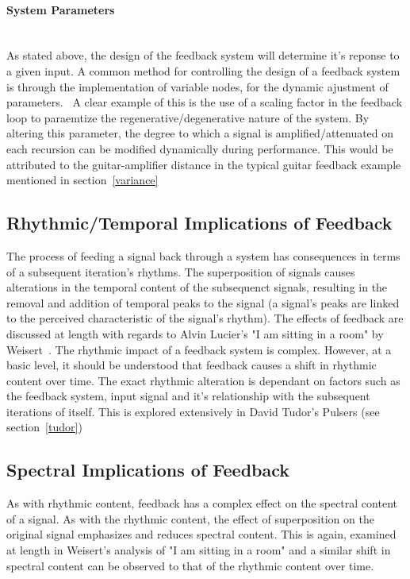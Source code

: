 \documentclass[titlepage]{scrartcl}
\begin{document}
    \paragraph{System Parameters}\mbox{}\\
    As stated above, the design of the feedback system will determine it's
    reponse to a given input. A common method for controlling the design of a
    feedback system is through the implementation of variable nodes, for the
    dynamic ajustment of parameters.~\parencite[p.19-27]{weisert2010ioi}
    A clear example of this is the use of a scaling factor in the feedback loop
    to paraemtize the regenerative/degenerative nature of the system. By
    altering this parameter, the degree to which a signal is
    amplified/attenuated on each recursion can be modified dynamically during
    performance. This would be attributed to the guitar-amplifier distance in
    the typical guitar feedback example mentioned in section~\ref{variance}

    \subsection{Rhythmic/Temporal Implications of Feedback}
    The process of feeding a signal back through a system has consequences in
    terms of a subsequent iteration's rhythms. The superposition of signals
    causes alterations in the temporal content of the subsequenct signals,
    resulting in the removal and addition of temporal peaks to the signal (a
    signal's peaks are linked to the perceived characteristic of the signal's
    rhythm).  The effects of feedback are discussed at length with regards to
    Alvin Lucier's "I am sitting in a room" by
    Weisert~\parencite[p.64-68]{weisert2010ioi}. The rhythmic impact of a
    feedback system is complex. However, at a basic level, it should be
    understood that feedback causes a shift in rhythmic content over time.  The
    exact rhythmic alteration is dependant on factors such as the feedback
    system, input signal and it's relationship with the subsequent iterations
    of itself. This is explored extensively in David Tudor's Pulsers (see
    section~\ref{tudor})

    \subsection{Spectral Implications of Feedback}
    As with rhythmic content, feedback has a complex effect on the spectral
    content of a signal. As with the rhythmic content, the effect of
    superposition on the original signal emphasizes and reduces spectral
    content. This is again, examined at length in Weisert's analysis of "I am
    sitting in a room" and a similar shift in spectral content can be observed
    to that of the rhythmic content over
    time.~\parencite[p.60-64]{weisert2010ioi}
    
\end{document}

